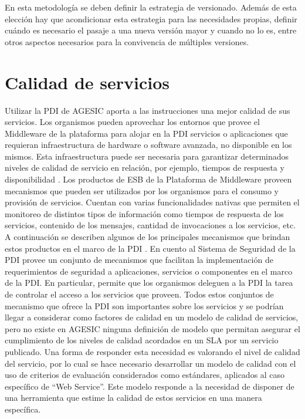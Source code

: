 En esta metodología se deben definir la estrategia de versionado. Además de esta elección hay que acondicionar esta estrategia para las necesidades propias, definir cuándo es necesario el pasaje a una nueva versión mayor y cuando no lo es, entre otros aspectos necesarios para la convivencia de múltiples versiones.

\section{Calidad de servicios}
\label{Analisis:CalidadServicios}
Utilizar la PDI de AGESIC aporta a las instrucciones una mejor calidad de sus servicios. Los organismos pueden aprovechar los entornos que provee el Middleware de la plataforma para alojar en la PDI  servicios o aplicaciones que requieran infraestructura de hardware o  software avanzada, no disponible en los mismos. Esta infraestructura  puede ser necesaria para garantizar determinados niveles de calidad de  servicio en relación, por ejemplo, tiempos de respuesta y disponibilidad \cite{Agesic:GuiaUsos}.
Los productos de ESB de la Plataforma de Middleware proveen  mecanismos que pueden ser utilizados por los organismos para el consumo y provisión de servicios. Cuentan con varias funcionalidades nativas que permiten el monitoreo de distintos tipos de información como tiempos de  respuesta de los servicios, contenido de los mensajes, cantidad de  invocaciones a los servicios, etc.
A continuación se describen algunos de los principales mecanismos que  brindan estos productos en el marco de la PDI \cite{AGESIC:PDI}.
En cuento al Sistema de Seguridad de la PDI provee un conjunto de mecanismos que facilitan la implementación de requerimientos de seguridad a aplicaciones, servicios o componentes en el marco de la PDI. En particular, permite que los organismos deleguen a la PDI la tarea de controlar el acceso a los servicios que proveen.
Todos estos conjuntos de mecanismo que ofrece la PDI son importantes sobre los servicios y se podrían llegar a considerar como factores de calidad en un modelo de calidad de servicios, pero no existe en AGESIC ninguna definición de modelo que  permitan asegurar el cumplimiento de los niveles de calidad acordados en un SLA por un servicio publicado. 
Una forma de responder esta necesidad es valorando el nivel de calidad del servicio, por lo cual se hace necesario desarrollar un modelo de calidad con el uso de criterios de evaluación considerados como estándares, aplicados al caso específico de “Web Service”. Este modelo responde a la necesidad de disponer de una herramienta que estime la calidad de estos servicios en una manera específica.

